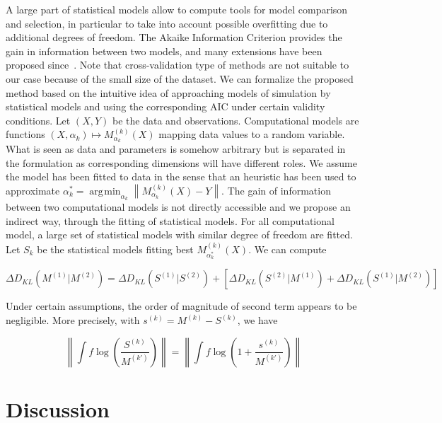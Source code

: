 \documentclass[Royal,sageh,times]{sagej}
\newcommand{\norm}[1]{\left\lVert #1 \right\rVert}
\DeclareMathOperator*{\argmin}{\arg\!\min}
\begin{document}


A large part of statistical models allow to compute tools for model comparison and selection, in particular to take into account possible overfitting due to additional degrees of freedom. The Akaike Information Criterion provides the gain in information between two models, and many extensions have been proposed since~\cite{}.%
Note that cross-validation type of methods are not suitable to our case because of the small size of the dataset. We can formalize the proposed method based on the intuitive idea of approaching models of simulation by statistical models and using the corresponding AIC under certain validity conditions. Let $(X,Y)$ be the data and observations. Computational models are functions $(X,\alpha_k) \mapsto M_{\alpha_k}^{(k)}(X)$ mapping data values to a random variable. What is seen as data and parameters is somehow arbitrary but is separated in the formulation as corresponding dimensions will have different roles. We assume the model has been fitted to data in the sense that an heuristic has been used to approximate $\alpha^{\ast}_k = \argmin_{\alpha_k}\norm{M_{\alpha_k}^{(k)}(X) - Y}$. The gain of information between two computational models is not directly accessible and we propose an indirect way, through the fitting of statistical models. For all computational model, a large set of statistical models with similar degree of freedom are fitted. %
Let $S_k$ be the statistical models fitting best $M^{(k)}_{\alpha^{\ast}_k}(X)$. We can compute

\[
\Delta D_{KL} \left(M^{(1)}|M^{(2)}\right) = \Delta D_{KL} \left(S^{(1)}|S^{(2)}\right) + \left[ \Delta D_{KL} \left(S^{(2)}|M^{(1)}\right) + \Delta D_{KL} \left(S^{(1)}|M^{(2)}\right) \right]
\]

Under certain assumptions, the order of magnitude of second term appears to be negligible. More precisely, with $s^{(k)}=M^{(k)}-S^{(k)}$, we have

\[
\norm{\int f \log{\left(\frac{S^{(k)}}{M^{(k')}}\right)}} = \norm{\int f \log{\left(1 + \frac{s^{(k)}}{M^{(k')}}\right)}}
\]


\section*{Discussion}
\end{document}

